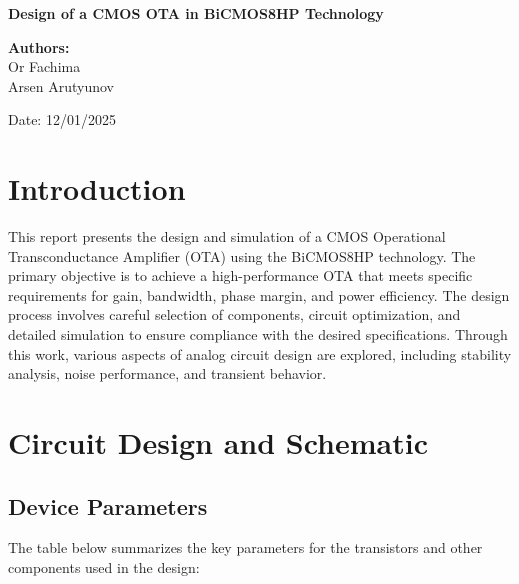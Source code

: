 \documentclass[12pt,a4paper]{article}
\begin{document}
\begin{titlepage}
    \centering
    \vspace*{1.5cm}

    \Huge
    \textbf{Design of a CMOS OTA in BiCMOS8HP Technology}

    \vspace{2cm}

    \LARGE
    \textbf{Authors:}
    \vspace{0.5cm}\\
    Or Fachima  \\
    Arsen Arutyunov 

    \vspace{2cm}
    \large
    Date: 12/01/2025

    \vfill
\end{titlepage}

\section*{Introduction}
This report presents the design and simulation of a CMOS Operational Transconductance Amplifier (OTA) using the BiCMOS8HP technology. The primary objective is to achieve a high-performance OTA that meets specific requirements for gain, bandwidth, phase margin, and power efficiency. The design process involves careful selection of components, circuit optimization, and detailed simulation to ensure compliance with the desired specifications. Through this work, various aspects of analog circuit design are explored, including stability analysis, noise performance, and transient behavior.

\section*{Circuit Design and Schematic}
\subsection*{Device Parameters}
The table below summarizes the key parameters for the transistors and other components used in the design:
\end{document}
